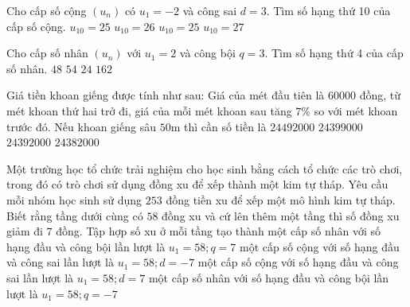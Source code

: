 \begin{ex}
Cho cấp số cộng $(u_n)$ có $u_1=-2$ và công sai $d=3$. Tìm số hạng thứ 10 của cấp số cộng.
\choice
{$u_{10}=25$}
{$u_{10}=26$}
{\True $u_{10}=25$}
{$u_{10}=27$}
\end{ex}
\begin{ex}
Cho cấp số nhân $(u_n)$ với $u_1=2$ và công bội $q=3$. Tìm số hạng thứ 4 của cấp số nhân.
\choice
{$48$}
{\True $54$}
{$24$}
{$162$}
\end{ex}
\begin{ex}
Giá tiền khoan giếng được tính như sau: Giá của mét đầu tiên là $60000$ đồng, từ mét khoan thứ hai trở đi, giá của mỗi mét khoan sau tăng $7\%$ so với mét khoan trước đó. Nếu khoan giếng sâu $50\text{m}$ thì cần số tiền là
\choice
{$24492000$}
{$24399000$}
{\True $24392000$}
{$24382000$}
\end{ex}
\begin{ex}
Một trường học tổ chức trải nghiệm cho học sinh bằng cách tổ chức các trò chơi, trong đó có trò chơi sử dụng đồng xu để xếp thành một kim tự tháp. Yêu cầu mỗi nhóm học sinh sử dụng $253$ đồng tiền xu để xếp một mô hình kim tự tháp. Biết rằng tầng dưới cùng có $58$ đồng xu và cứ lên thêm một tầng thì số đồng xu giảm đi $7$ đồng. Tập hợp số xu ở mỗi tầng tạo thành
\choice
{một cấp số nhân với số hạng đầu và công bội lần lượt là $u_1=58;q=7$}
{\True một cấp số cộng với số hạng đầu và công sai lần lượt là $u_1=58;d=-7$}
{một cấp số cộng với số hạng đầu và công sai lần lượt là $u_1=58;d=7$}
{một cấp số nhân với số hạng đầu và công bội lần lượt là $u_1=58;q=-7$}
\end{ex}
